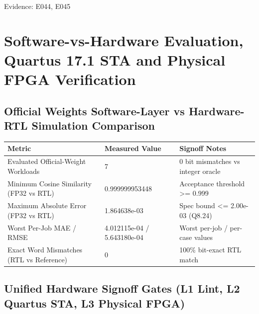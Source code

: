 \documentclass[11pt,a4paper]{article}
\begin{document}
{\small Evidence: E044,\allowbreak{} E045}

\section{Software-vs-Hardware Evaluation, Quartus 17.1 STA and Physical FPGA Verification}

\subsection{Official Weights Software-Layer vs Hardware-RTL Simulation Comparison}

{\small\renewcommand{\arraystretch}{1.18}\begin{longtable}{@{}L{0.38\textwidth}|L{0.26\textwidth}|L{0.28\textwidth}@{}}\toprule

\textbf{Metric} & \textbf{Measured Value} & \textbf{Signoff Notes}\\\midrule\endhead

Evaluated Official-Weight Workloads & 7 & 0 bit mismatches vs integer oracle\\[2pt]\hline

Minimum Cosine Similarity (\allowbreak{}FP32 vs RTL)\allowbreak{} & 0.99999995\allowbreak{}3448 & Acceptance threshold >=\allowbreak{} 0.999\\[2pt]\hline

Maximum Absolute Error (\allowbreak{}FP32 vs RTL)\allowbreak{} & 1.864638e-03 & Spec bound <=\allowbreak{} 2.00e-03 (\allowbreak{}Q8.24)\allowbreak{}\\[2pt]\hline

Worst Per-Job MAE /\allowbreak{} RMSE & 4.012115e-04 /\allowbreak{} 5.643180e-04 & Worst per-job /\allowbreak{} per-case values\\[2pt]\hline

Exact Word Mismatches (\allowbreak{}RTL vs Reference)\allowbreak{} & 0 & 100\% bit-exact RTL match\\[2pt]\hline

\bottomrule\end{longtable}}

\subsection{Unified Hardware Signoff Gates (L1 Lint, L2 Quartus STA, L3 Physical FPGA)}
\end{document}
